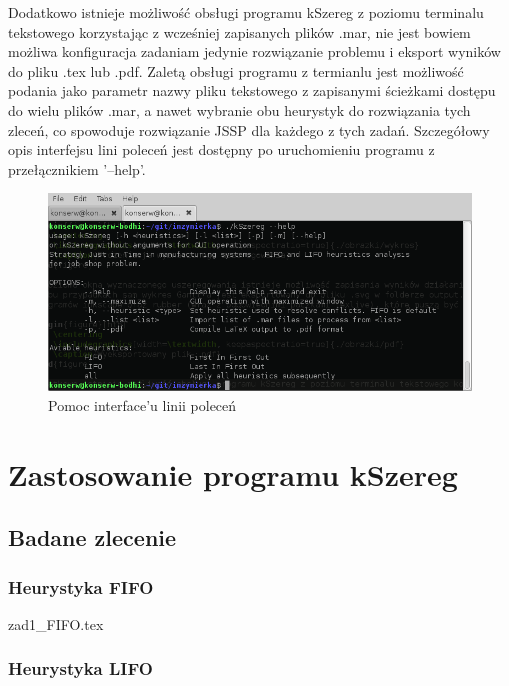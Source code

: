 \documentclass[twoside]{kInzynierka}
\begin{document}
Dodatkowo istnieje możliwość obsługi programu kSzereg z poziomu terminalu tekstowego korzystając z wcześniej zapisanych plików .mar, nie jest bowiem możliwa konfiguracja zadaniam jedynie rozwiązanie problemu i eksport wyników do pliku .tex lub .pdf. Zaletą obsługi programu z termianlu jest możliwość podania jako parametr nazwy pliku tekstowego z zapisanymi ścieżkami dostępu do wielu plików .mar, a nawet wybranie obu heurystyk do rozwiązania tych zleceń, co spowoduje rozwiązanie JSSP dla każdego z tych zadań.%
Szczegółowy opis interfejsu lini poleceń jest dostępny po uruchomieniu programu z przełącznikiem '--help'.

\begin{figure}[htb]
    \centering
    \includegraphics[width=\textwidth, keepaspectratio=true]{./obrazki/cli}
    \caption{Pomoc interface'u linii poleceń}
\end{figure}

   
\section      %
                {Zastosowanie programu kSzereg}
       
\subsection     {Badane zlecenie}
\label{sec:z1}
\subsubsection  {Heurystyka FIFO}
\label{sec:z1f}
 {zad1_FIFO.tex}
\subsubsection  {Heurystyka LIFO}
\label{sec:z1l}

\end{document}
